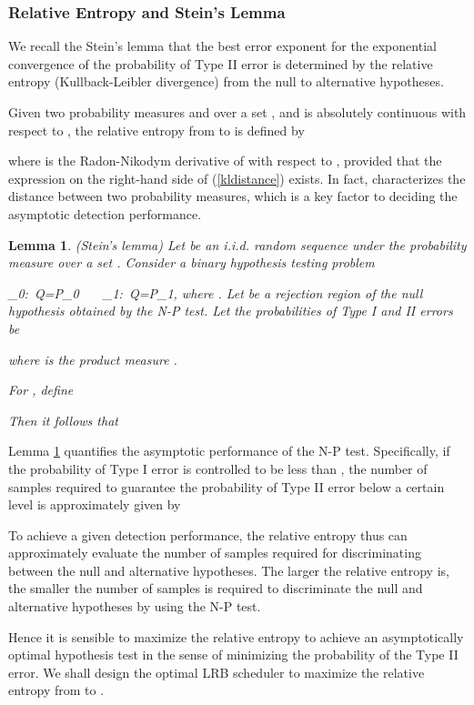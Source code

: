 \documentclass[journal]{IEEEtran}
\def\cH{\mathcal{H}}
\def\bee{}
\newtheorem{lem}{Lemma}
\begin{document}
\subsubsection{Relative Entropy and Stein's Lemma}
We recall the Stein's lemma \cite{cover2006eit} that the best error exponent for the exponential convergence of the probability of Type II error is determined by the relative entropy (Kullback-Leibler divergence) from the null to alternative hypotheses.

 Given two probability measures  and  over a set , and  is absolutely continuous with respect to , the relative entropy  from  to  is defined by

where  is the Radon-Nikodym derivative \cite{ash2000pam} of  with respect to , provided that the expression on the right-hand side of (\ref{kldistance}) exists. In fact,  characterizes the distance between two probability measures, which is a key factor to deciding the asymptotic detection performance.

\begin{lem}(Stein's lemma) \label{lem_chernoff}Let  be an i.i.d. random sequence under the probability measure  over a set . Consider a binary hypothesis testing problem
\bee
\label{hypotest}
\cH_{0}:~Q=P_0~~ ~\cH_{1}:~Q=P_1,
\ene where . Let  be a rejection region of the null hypothesis  obtained by the N-P test. Let the probabilities of Type I and II errors be

where  is the product measure \cite{ash2000pam}.

For , define

Then it follows that

\end{lem}

Lemma \ref{lem_chernoff}  quantifies the asymptotic performance of the N-P test. Specifically, if the probability of Type I error is controlled to be less than , the number of samples required to guarantee the probability of Type II error below a certain level  is approximately given by


To achieve a given detection performance, the relative entropy thus can approximately evaluate the number of samples required for discriminating between the null and alternative hypotheses. The larger the relative entropy is, the smaller the number of samples is required to discriminate the null and alternative hypotheses by using the N-P test.

Hence it is sensible to maximize the relative entropy  to achieve an asymptotically optimal hypothesis test in the sense of minimizing the probability of the Type II error. We shall design the optimal LRB scheduler to maximize the relative entropy from  to .\\
\end{document}

